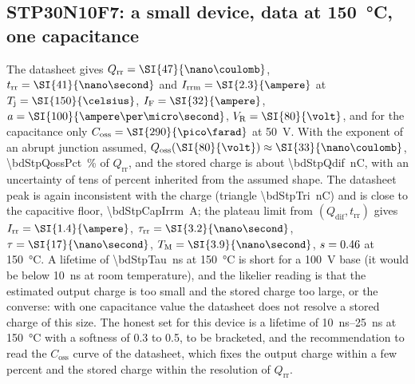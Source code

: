 \documentclass[10pt,a4paper]{scrartcl}
\newcommand{\IF}{I_\mathrm{F}}
\newcommand{\VR}{V_\mathrm{R}}
\newcommand{\Irr}{I_\mathrm{rr}}
\newcommand{\Irrm}{I_\mathrm{rrm}}
\newcommand{\Qrr}{Q_\mathrm{rr}}
\newcommand{\Qdif}{Q_\mathrm{dif}}
\newcommand{\Qoss}{Q_\mathrm{oss}}
\newcommand{\Coss}{C_\mathrm{oss}}
\newcommand{\trr}{t_\mathrm{rr}}
\newcommand{\taurr}{\tau_\mathrm{rr}}
\newcommand{\TM}{T_\mathrm{M}}
\newcommand{\Tj}{T_\mathrm{j}}
\newcommand{\STP}{STP30N10F7}
\begin{document}
\subsection{\STP{}: a small device, data at \SI{150}{\celsius}, one capacitance}
The datasheet gives $\Qrr = \SI{\bdStpQrr}{\nano\coulomb}$, $\trr = \SI{\bdStpTrr}{\nano\second}$ and $\Irrm = \SI{\bdStpIrrm}{\ampere}$ at $\Tj = \SI{\bdStpT}{\celsius}$, $\IF = \SI{\bdStpIf}{\ampere}$, $a = \SI{\bdStpSlope}{\ampere\per\micro\second}$, $\VR = \SI{\bdStpVr}{\volt}$, and for the capacitance only $\Coss = \SI{\bdStpCoss}{\pico\farad}$ at \SI{50}{\volt}. With the exponent of an abrupt junction assumed, $\Qoss(\SI{80}{\volt}) \approx \SI{\bdStpQoss}{\nano\coulomb}$, \SI{\bdStpQossPct}{\percent} of $\Qrr$, and the stored charge is about \SI{\bdStpQdif}{\nano\coulomb}, with an uncertainty of tens of percent inherited from the assumed shape. The datasheet peak is again inconsistent with the charge (triangle \SI{\bdStpTri}{\nano\coulomb}) and is close to the capacitive floor, \SI{\bdStpCapIrrm}{\ampere}; the plateau limit from $(\Qdif, \trr)$ gives $\Irr = \SI{\bdStpIrr}{\ampere}$, $\taurr = \SI{\bdStpTaurr}{\nano\second}$, $\tau = \SI{\bdStpTau}{\nano\second}$, $\TM = \SI{\bdStpTm}{\nano\second}$, $s = 0.46$ at \SI{150}{\celsius}. A lifetime of \SI{\bdStpTau}{\nano\second} at \SI{150}{\celsius} is short for a \SI{100}{\volt} base (it would be below \SI{10}{\nano\second} at room temperature), and the likelier reading is that the estimated output charge is too small and the stored charge too large, or the converse: with one capacitance value the datasheet does not resolve a stored charge of this size. The honest set for this device is a lifetime of \SIrange{10}{25}{\nano\second} at \SI{150}{\celsius} with a softness of 0.3 to 0.5, to be bracketed, and the recommendation to read the $\Coss$ curve of the datasheet, which fixes the output charge within a few percent and the stored charge within the resolution of $\Qrr$.
\end{document}
